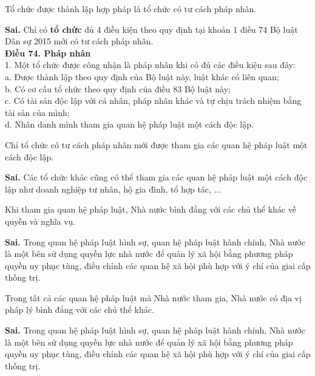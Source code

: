\begin{ques}
Tổ chức được thành lập hợp pháp là tổ chức có tư cách pháp nhân.
\end{ques}
\begin{ans}
\textbf{Sai.} Chỉ có \textbf{tổ chức} đủ 4 điều kiện theo quy định tại khoản 1 điều 74 Bộ luật Dân sự 2015 mới có tư cách pháp nhân.\\
\textbf{Điều 74. Pháp nhân}\\
1. Một tổ chức được công nhận là pháp nhân khi có đủ các điều kiện sau đây:\\
a. Được thành lập theo quy định của Bộ luật này, luật khác có liên quan;\\
b. Có cơ cấu tổ chức theo quy định của điều 83 Bộ luật này;\\
c. Có tài sản độc lập với cá nhân, pháp nhân khác và tự chịu trách nhiệm bằng tài sản của mình;\\
d. Nhân danh mình tham gia quan hệ pháp luật một cách độc lập.
\end{ans}

\begin{ques}
Chỉ tổ chức có tư cách pháp nhân mới được tham gia các quan hệ pháp luật một cách độc lập.
\end{ques}
\begin{ans}
\textbf{Sai.} Các tổ chức khác cũng có thể tham gia các quan hệ pháp luật một cách độc lập như doanh nghiệp tư nhân, hộ gia đình, tổ hợp tác, ...
\end{ans}

\begin{ques}
Khi tham gia quan hệ pháp luật, Nhà nước bình đẳng với các chủ thể khác về quyền và nghĩa vụ.
\end{ques}
\begin{ans}
\textbf{Sai.} Trong quan hệ pháp luật hình sự, quan hệ pháp luật hành chính, Nhà nước là một bên sử dụng quyền lực nhà nước để quản lý xã hội bằng phương pháp quyền uy phục tùng, điều chỉnh các quan hệ xã hội phù hợp với ý chí của giai cấp thống trị.
\end{ans}

\begin{ques}
Trong tất cả các quan hệ pháp luật mà Nhà nước tham gia, Nhà nước có địa vị pháp lý bình đẳng với các chủ thể khác.
\end{ques}
\begin{ans}
\textbf{Sai.} Trong quan hệ pháp luật hình sự, quan hệ pháp luật hành chính, Nhà nước là một bên sử dụng quyền lực nhà nước để quản lý xã hội bằng phương pháp quyền uy phục tùng, điều chỉnh các quan hệ xã hội phù hợp với ý chí của giai cấp thống trị.
\end{ans}

